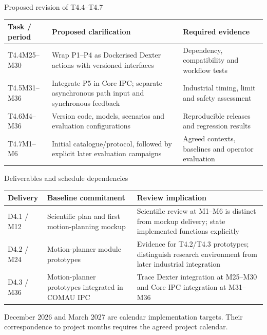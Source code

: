 \documentclass[aspectratio=169,10pt]{beamer}
\begin{document}
\begin{frame}{Proposed revision of T4.4--T4.7}
\small\renewcommand{\arraystretch}{1.25}
\begin{tabularx}{\textwidth}{@{}p{}XX@{}}
\toprule
Task / period & Proposed clarification & Required evidence\\\midrule
T4.4\newline M25--M30 & Wrap P1--P4 as Dockerised Dexter actions with versioned interfaces & Dependency, compatibility and workflow tests\\
T4.5\newline M31--M36 & Integrate P5 in Core IPC; separate asynchronous path input and synchronous feedback & Industrial timing, limit and safety assessment\\
T4.6\newline M4--M36 & Version code, models, scenarios and evaluation configurations & Reproducible releases and regression results\\
T4.7\newline M1--M6 & Initial catalogue/protocol, followed by explicit later evaluation campaigns & Agreed contexts, baselines and operator evaluation\\\bottomrule
\end{tabularx}
\end{frame}

\begin{frame}{Deliverables and schedule dependencies}
\small\renewcommand{\arraystretch}{1.35}
\begin{tabularx}{\textwidth}{@{}p{}XX@{}}
\toprule
Delivery & Baseline commitment & Review implication\\\midrule
D4.1 / M12 & Scientific plan and first motion-planning mockup & Scientific review at M1--M6 is distinct from mockup delivery; state implemented functions explicitly\\
D4.2 / M24 & Motion-planner module prototypes & Evidence for T4.2/T4.3 prototypes; distinguish research environment from later industrial integration\\
D4.3 / M36 & Motion-planner prototypes integrated in COMAU IPC & Trace Dexter integration at M25--M30 and Core IPC integration at M31--M36\\\bottomrule
\end{tabularx}\par\medskip\small December 2026 and March 2027 are calendar implementation targets. Their correspondence to project months requires the agreed project calendar.
\end{frame}
\end{document}
